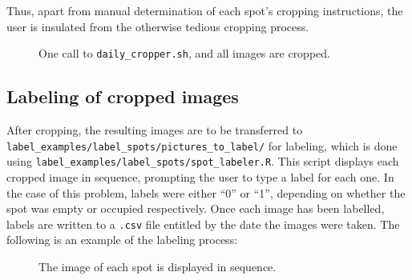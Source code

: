 \documentclass[a4paper, 11pt]{article} %
\begin{document}
		Thus, apart from manual determination of each spot's cropping instructions, the user is insulated from
		the otherwise tedious cropping process.
		\begin{figure}[H]
			\centering
			\caption{One call to \texttt{daily\_cropper.sh}, and all images are cropped.}
		\end{figure}

	\subsection{Labeling of cropped images}
		After cropping, the resulting images are to be transferred to\\
		\texttt{label\_examples/label\_spots/pictures\_to\_label/} for labeling, 
		which is done using 
		\texttt{label\_examples/label\_spots/spot\_labeler.R}. This script displays
		each cropped image in sequence, prompting the user to type a label for each
		one. In the case of this problem, labels were either ``0'' or ``1'',
		depending on whether the spot was empty or occupied respectively. Once each
		image has been labelled, labels are written to a \texttt{.csv} file
		entitled by the date the images were taken. The following is an example of
		the labeling process:
		\begin{figure}[H]
			\centering
			\caption{The image of each spot is displayed in sequence.}
		\end{figure}
	
\end{document}
